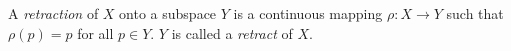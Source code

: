 A \textit{retraction} of $X$ onto a subspace $Y$ is a continuous mapping $\rho: X \to Y$ such that $\rho(p) = p$ for all $p \in Y$. $Y$ is called a \textit{retract} of $X$.
